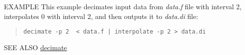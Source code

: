 \begin{options}
\end{options}

\begin{qsection}{EXAMPLE}
This example decimates input data from {\em data.f} file with interval 2,
interpolates 0 with interval 2, and then outputs it to {\em
data.di} file:
\begin{quote}
  \verb!decimate -p 2  < data.f | interpolate -p 2 > data.di!
\end{quote}
\end{qsection}

\begin{qsection}{SEE ALSO}
\hyperlink{decimate}{decimate}
\end{qsection}
